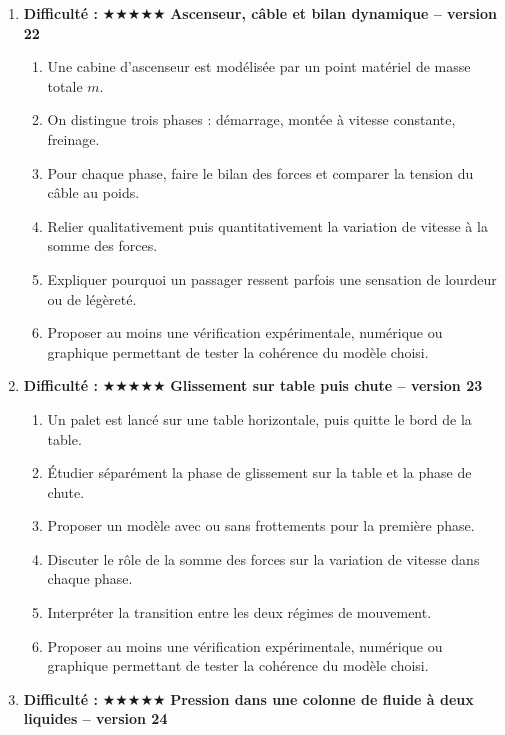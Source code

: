 \documentclass[11pt,a4paper]{article}
\newcommand{\etoiles}[1]{\textbf{Difficulté : }#1}
\begin{document}
\begin{enumerate}[label=\textbf{Problème long \arabic*.},leftmargin=*]
\begin{enumerate}[label=\alph*)]
\item Discuter les limites du modèle de charge ponctuelle dans cette expérience.
\item Proposer au moins une vérification expérimentale, numérique ou graphique permettant de tester la cohérence du modèle choisi.
\end{enumerate}
\item \etoiles{★★★★★}
\textbf{Ascenseur, câble et bilan dynamique -- version 22}
\begin{enumerate}[label=\alph*)]
\item Une cabine d'ascenseur est modélisée par un point matériel de masse totale $m$.
\item On distingue trois phases : démarrage, montée à vitesse constante, freinage.
\item Pour chaque phase, faire le bilan des forces et comparer la tension du câble au poids.
\item Relier qualitativement puis quantitativement la variation de vitesse à la somme des forces.
\item Expliquer pourquoi un passager ressent parfois une sensation de lourdeur ou de légèreté.
\item Proposer au moins une vérification expérimentale, numérique ou graphique permettant de tester la cohérence du modèle choisi.
\end{enumerate}
\item \etoiles{★★★★★}
\textbf{Glissement sur table puis chute -- version 23}
\begin{enumerate}[label=\alph*)]
\item Un palet est lancé sur une table horizontale, puis quitte le bord de la table.
\item Étudier séparément la phase de glissement sur la table et la phase de chute.
\item Proposer un modèle avec ou sans frottements pour la première phase.
\item Discuter le rôle de la somme des forces sur la variation de vitesse dans chaque phase.
\item Interpréter la transition entre les deux régimes de mouvement.
\item Proposer au moins une vérification expérimentale, numérique ou graphique permettant de tester la cohérence du modèle choisi.
\end{enumerate}
\item \etoiles{★★★★★}
\textbf{Pression dans une colonne de fluide à deux liquides -- version 24}
\begin{enumerate}[label=\alph*)]

\end{enumerate}
\end{enumerate}
\end{document}
